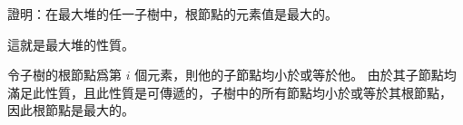 \startEXERCISE
證明：在最大堆的任一子樹中，根節點的元素值是最大的。
\stopEXERCISE

\startANSWER
這就是最大堆的性質。

令子樹的根節點爲第 $i$ 個元素，則他的子節點均小於或等於他。
由於其子節點均滿足此性質，且此性質是可傳遞的，子樹中的所有節點均小於或等於其根節點，
因此根節點是最大的。
\stopANSWER
